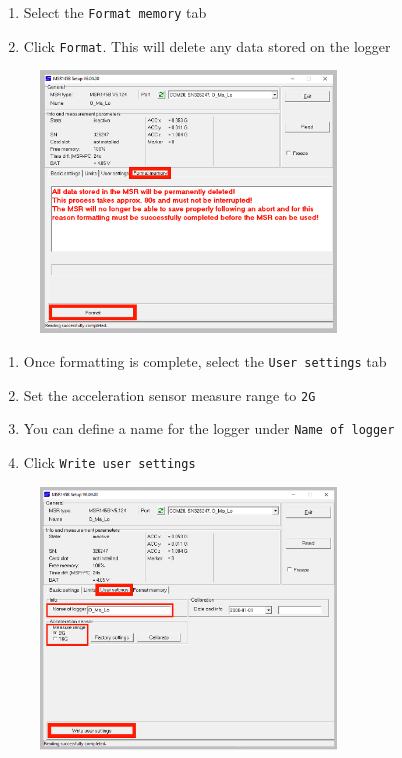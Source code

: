 \documentclass[
  letterpaper,
  DIV=11,
  numbers=noendperiod]{scrreprt}
\providecommand{\tightlist}{%
  \setlength{\itemsep}{0pt}\setlength{\parskip}{0pt}}\usepackage{longtable,booktabs,array}
\begin{document}
\begin{enumerate}
\def\labelenumi{\arabic{enumi}.}
\setcounter{enumi}{4}
\tightlist
\item
  Select the \texttt{Format\ memory} tab
\item
  Click \texttt{Format}. This will delete any data stored on the logger
\end{enumerate}

\begin{figure}

{\centering \includegraphics[width=0.7\textwidth,height=\textheight]{chapters/figs/MSRStep2.png}

}

\end{figure}

\begin{enumerate}
\def\labelenumi{\arabic{enumi}.}
\setcounter{enumi}{6}
\tightlist
\item
  Once formatting is complete, select the \texttt{User\ settings} tab
\item
  Set the acceleration sensor measure range to \texttt{2G}
\item
  You can define a name for the logger under \texttt{Name\ of\ logger}
\item
  Click \texttt{Write\ user\ settings}
\end{enumerate}

\begin{figure}

{\centering \includegraphics[width=0.7\textwidth,height=\textheight]{chapters/figs/MSRStep3.png}

}

\end{figure}
\end{document}
